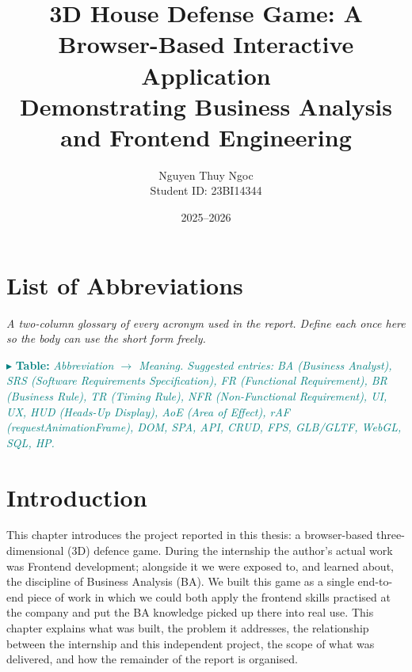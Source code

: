 \documentclass[12pt,a4paper]{report}
\title{3D House Defense Game: A Browser-Based Interactive Application\\
       Demonstrating Business Analysis and Frontend Engineering}
\author{Nguyen Thuy Ngoc\\Student ID: 23BI14344}
\date{2025--2026}
\newcommand{\needtab}[1]{\par\smallskip\noindent%
  \textcolor{teal}{$\blacktriangleright$ \textbf{Table:} \textit{#1}}\par\smallskip}
\newcommand{\guide}[1]{\par\noindent\textit{#1}\par}
\begin{document}
\maketitle


\chapter*{List of Abbreviations}
\guide{A two-column glossary of every acronym used in the report. Define each
once here so the body can use the short form freely.}
\needtab{Abbreviation $\to$ Meaning. Suggested entries: BA (Business Analyst),
SRS (Software Requirements Specification), FR (Functional Requirement),
BR (Business Rule), TR (Timing Rule), NFR (Non-Functional Requirement),
UI, UX, HUD (Heads-Up Display), AoE (Area of Effect), rAF
(requestAnimationFrame), DOM, SPA, API, CRUD, FPS, GLB/GLTF, WebGL, SQL, HP.}

\tableofcontents
\listoffigures
\listoftables

\chapter{Introduction}

This chapter introduces the project reported in this thesis: a browser-based
three-dimensional (3D) defence game. During the internship the author's actual
work was Frontend development; alongside it we were exposed to, and learned
about, the discipline of Business Analysis (BA). We built this game as a single
end-to-end piece of work in which we could both apply the frontend skills
practised at the company and put the BA knowledge picked up there into real use.
This chapter explains what was built, the problem it addresses, the relationship
between the internship and this independent project, the scope of what was
delivered, and how the remainder of the report is organised.
\end{document}
